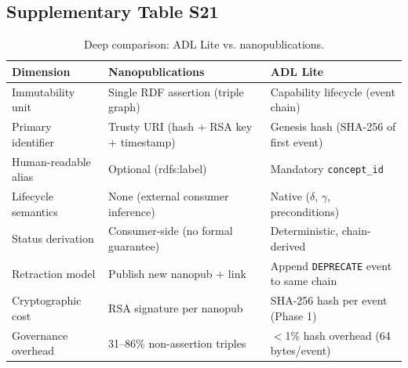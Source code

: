 \subsection{Supplementary Table S21}\label{tab:S21}
\begin{table}[htbp]
\centering
\footnotesize
\caption{Deep comparison: ADL Lite vs. nanopublications.}
\label{tab:nanopub-deep-compare}
\begin{tabular}{@{}p{3.2cm}p{4.8cm}p{4.8cm}@{}}
\toprule
\textbf{Dimension} & \textbf{Nanopublications} & \textbf{ADL Lite} \\
\midrule
Immutability unit & Single RDF assertion (triple graph) & Capability lifecycle (event chain) \\
Primary identifier & Trusty URI (hash + RSA key + timestamp) & Genesis hash (SHA-256 of first event) \\
Human-readable alias & Optional (rdfs:label) & Mandatory \texttt{concept\_id} \\
Lifecycle semantics & None (external consumer inference) & Native ($\delta$, $\gamma$, preconditions) \\
Status derivation & Consumer-side (no formal guarantee) & Deterministic, chain-derived \\
Retraction model & Publish new nanopub + link & Append \texttt{DEPRECATE} event to same chain \\
Cryptographic cost & RSA signature per nanopub & SHA-256 hash per event (Phase 1) \\
Governance overhead & 31--86\% non-assertion triples~\cite{nanopublications} & $<$1\% hash overhead (64 bytes/event) \\
\bottomrule
\end{tabular}
\end{table}

